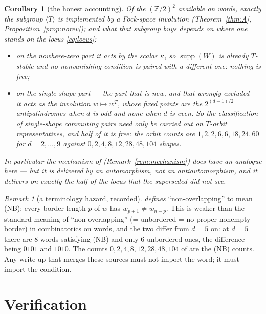 \documentclass[11pt]{article}
\newtheorem{corollary}[theorem]{Corollary}
\theoremstyle{definition}
\theoremstyle{remark}
\newtheorem{remark}[theorem]{Remark}
\newcommand{\Z}{\mathbb{Z}}
\begin{document}
\begin{corollary}[the honest accounting]\label{cor:accounting}
Of the $(\Z/2)^2$ available on words, exactly the subgroup $\langle T\rangle$ is implemented
by a Fock-space involution (Theorem~\ref{thm:A}, Proposition~\ref{prop:norev}); and what that
subgroup buys depends on where one stands on the locus \eqref{eq:locus}:
\begin{itemize}
\item on the nowhere-zero part it acts by the scalar $\kappa$, so
  $\operatorname{supp}(W)$ is already $T$-stable and no nonvanishing condition is paired with
  a different one: \emph{nothing is free};
\item on the single-shape part --- the part that is new, and that
  \cite[Lem.~8.2]{Q149} wrongly excluded --- it acts as the involution $w\mapsto w^{T}$, whose
  fixed points are the $2^{(d-1)/2}$ antipalindromes when $d$ is odd and none when $d$ is even.
  So the classification of single-shape commuting pairs need only be carried out on
  $T$-orbit representatives, and \emph{half of it is free}: the orbit counts are
  $1,2,2,6,6,18,24,60$ for $d=2,\dots,9$ against $0,2,4,8,12,28,48,104$ shapes.
\end{itemize}
In particular the mechanism of \cite[\texttt{prop:threefourths}]{T2020}
(Remark~\ref{rem:mechanism}) does have an analogue here --- but it is delivered by an
automorphism, not an antiautomorphism, and it delivers on exactly the half of the locus that
the superseded \cite[Thm.~\texttt{thm:main}]{Q149} did not see.
\end{corollary}

\begin{remark}[a terminology hazard, recorded]\label{rem:NBname}
\cite[Def.~\texttt{def:border}]{Q150c2} \emph{defines} ``non-overlapping'' to mean
\textnormal{(NB)}: every border length $p$ of $w$ has $w_{p+1}\ne w_{n-p}$.  This is weaker than
the standard meaning of ``non-overlapping'' (= unbordered = no proper nonempty border) in
combinatorics on words, and the two differ from $d=5$ on: at $d=5$ there are $8$ words
satisfying (NB) and only $6$ unbordered ones, the difference being $0101$ and $1010$.  The
counts $0,2,4,8,12,28,48,104$ of \cite[\S ver]{Q150c2} are the (NB) counts.  Any write-up that
merges these sources must not import the word; it must import the condition.
\end{remark}

\section{Verification}\label{sec:ver}
\end{document}
